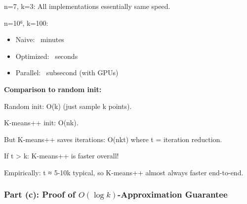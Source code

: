 \documentclass[12pt]{article}
\begin{document}
\begin{explanation}
n=7, k=3: All implementations essentially same speed.

n=10⁶, k=100:
\begin{itemize}
    \item Naive: ~minutes
    \item Optimized: ~seconds
    \item Parallel: ~subsecond (with GPUs)
\end{itemize}

\textbf{Comparison to random init:}

Random init: O(k) (just sample k points).

K-means++ init: O(nk).

But K-means++ saves iterations: O(nkt) where t = iteration reduction.

If t > k: K-means++ is faster overall!

Empirically: t ≈ 5-10k typical, so K-means++ almost always faster end-to-end.

\end{explanation}

\subsubsection{Part (c): Proof of $O(\log k)$-Approximation Guarantee}
\end{document}

